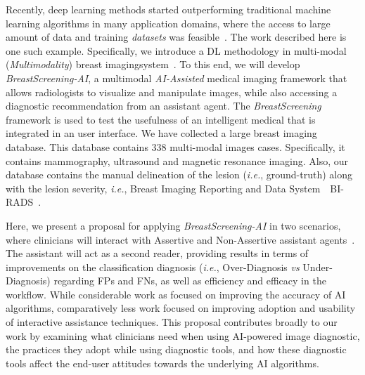 Recently, deep learning methods started outperforming traditional machine learning algorithms in many application domains, where the access to large amount of data and training {\it datasets} was feasible~\cite{mckinney2020international}.
The work described here is one such example.
Specifically, we introduce a  DL methodology in multi-modal ({\it Multimodality}) breast imaging\footnotemark[1] system~\cite{calisto2017mimbcdui, https://doi.org/10.13140/rg.2.2.29816.70409}.
To this end, we will develop {\it BreastScreening-AI}, a multimodal {\it AI-Assisted} medical imaging framework that allows radiologists to visualize and manipulate images, while also accessing a diagnostic recommendation from an assistant agent.
The {\it BreastScreening} framework is used to test the usefulness of an intelligent medical that is integrated in an user interface.
We have collected a large breast imaging database. This database contains 338 multi-modal images cases. Specifically, it contains mammography, ultrasound and magnetic resonance imaging.
Also, our database contains the manual delineation of the lesion ({\it i.e.}, ground-truth) along with the lesion severity, {\it i.e.}, Breast Imaging Reporting and Data System~\textemdash~BI-RADS~\cite{ghosh2019artificial}.


Here, we present a proposal for applying {\it BreastScreening-AI} in two scenarios, where clinicians will interact with Assertive and Non-Assertive assistant agents~\cite{pacheco2019alignment, 10.1145/3311350.3347162}.
The assistant will act as a second reader, providing results in terms of improvements on the classification diagnosis ({\it i.e.}, Over-Diagnosis {\it vs} Under-Diagnosis) regarding FPs and FNs, as well as efficiency and efficacy in the workflow.
While considerable work as focused on improving the accuracy of AI algorithms, comparatively less work focused on improving adoption and usability of interactive assistance techniques.
This proposal contributes broadly to our work by examining what clinicians need when using AI-powered image diagnostic, the practices they adopt while using diagnostic tools, and how these diagnostic tools affect the end-user attitudes towards the underlying AI algorithms.